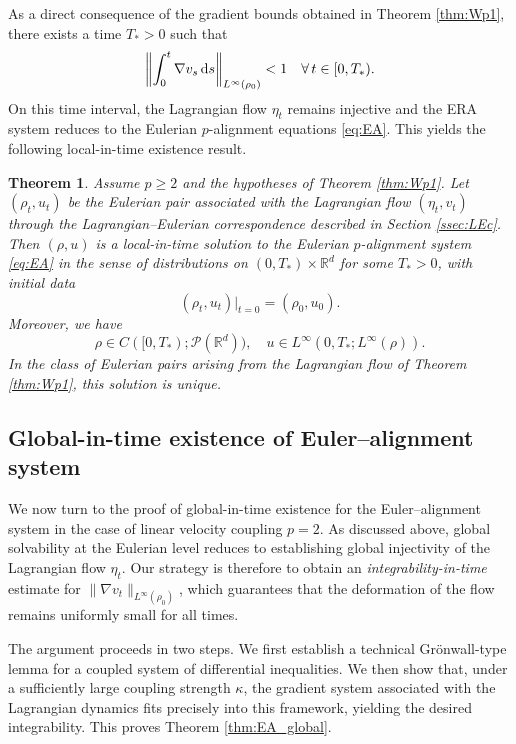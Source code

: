 \documentclass[10pt,reqno]{amsart}
\renewcommand{\geq}{\geqslant}
\numberwithin{equation}{section}
\newtheorem{theorem}{Theorem}[section]
\newcommand{\R}{\mathbb R}
\newcommand{\lt}{\left}
\newcommand{\rt}{\right}
\newcommand{\calP}{\mathcal P}
\newcommand{\ds}{\textnormal{d}s}
\begin{document}
As a direct consequence of the gradient bounds obtained in Theorem \ref{thm:Wp1}, there exists a time $T_*>0$ such that
\[
\lt\|\int_0^t \nabla v_s\,\ds \rt\|_{L^\infty(\rho_0)} < 1 \quad \forall\, t \in [0,T_*).
\]
On this time interval, the Lagrangian flow $\eta_t$ remains injective and the ERA system reduces to the Eulerian $p$-alignment equations \eqref{eq:EA}.  This yields the following local-in-time existence result.

\begin{theorem} \label{thm:EA_local}
Assume $p\geq 2$ and the hypotheses of Theorem \ref{thm:Wp1}. Let $(\rho_t,u_t)$ be the Eulerian pair associated with the Lagrangian flow $(\eta_t,v_t)$ through the Lagrangian--Eulerian correspondence described in Section \ref{ssec:LEc}. Then  $(\rho, u)$ is a local-in-time solution to the Eulerian $p$-alignment system \eqref{eq:EA} in the sense of distributions on $(0,T_*)\times\R^d$ for some $T_* > 0$, with initial data 
\[
(\rho_t, u_t)|_{t=0} = (\rho_0, u_0).
\]
Moreover, we have
\[
\rho \in C([0,T_*);\calP(\R^d)),\quad   u \in L^\infty(0,T_*; L^\infty(\rho)).
\]
In the class of Eulerian pairs arising from the Lagrangian flow of Theorem \ref{thm:Wp1}, this solution is unique.
\end{theorem}
%
%
%                      
%
%
 \subsection{Global-in-time existence of Euler--alignment system}  
We now turn to the proof of global-in-time existence for the Euler--alignment system in the case of linear velocity coupling $p=2$. As discussed above, global solvability at the Eulerian level reduces to establishing global injectivity of the Lagrangian flow $\eta_t$. Our strategy is therefore to obtain an \emph{integrability-in-time} estimate for $\|\nabla v_t\|_{L^\infty(\rho_0)}$, which guarantees that the deformation of the flow remains uniformly small for all times.

The argument proceeds in two steps. We first establish a technical Gr\"onwall-type lemma for a coupled system of differential inequalities. We then show that, under a sufficiently large coupling strength $\kappa$, the gradient system associated with the Lagrangian dynamics fits precisely into this framework, yielding the desired integrability. This proves Theorem \ref{thm:EA_global}.
\end{document}
